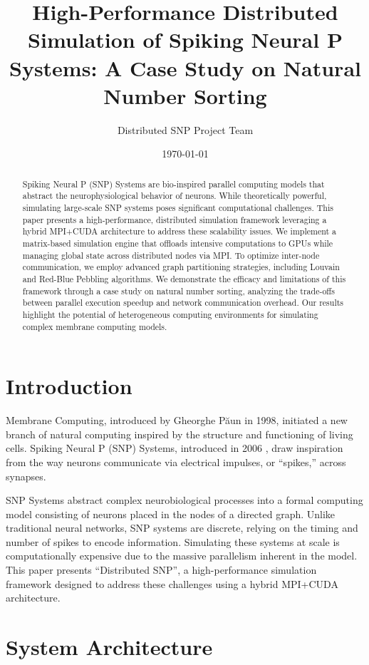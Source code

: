 \documentclass[11pt, a4paper]{article}
\title{High-Performance Distributed Simulation of Spiking Neural P Systems: A Case Study on Natural Number Sorting}
\author{Distributed SNP Project Team}
\date{\today}
\begin{document}
\maketitle

\begin{abstract}
Spiking Neural P (SNP) Systems are bio-inspired parallel computing models that abstract the neurophysiological behavior of neurons. While theoretically powerful, simulating large-scale SNP systems poses significant computational challenges. This paper presents a high-performance, distributed simulation framework leveraging a hybrid MPI+CUDA architecture to address these scalability issues. We implement a matrix-based simulation engine that offloads intensive computations to GPUs while managing global state across distributed nodes via MPI. To optimize inter-node communication, we employ advanced graph partitioning strategies, including Louvain and Red-Blue Pebbling algorithms. We demonstrate the efficacy and limitations of this framework through a case study on natural number sorting, analyzing the trade-offs between parallel execution speedup and network communication overhead. Our results highlight the potential of heterogeneous computing environments for simulating complex membrane computing models.
\end{abstract}

\section{Introduction}

Membrane Computing, introduced by Gheorghe Păun in 1998, initiated a new branch of natural computing inspired by the structure and functioning of living cells. Spiking Neural P (SNP) Systems, introduced in 2006 \cite{ionescu2006}, draw inspiration from the way neurons communicate via electrical impulses, or ``spikes,'' across synapses.

SNP Systems abstract complex neurobiological processes into a formal computing model consisting of neurons placed in the nodes of a directed graph. Unlike traditional neural networks, SNP systems are discrete, relying on the timing and number of spikes to encode information. Simulating these systems at scale is computationally expensive due to the massive parallelism inherent in the model. This paper presents ``Distributed SNP'', a high-performance simulation framework designed to address these challenges using a hybrid MPI+CUDA architecture.

\section{System Architecture}
\end{document}
